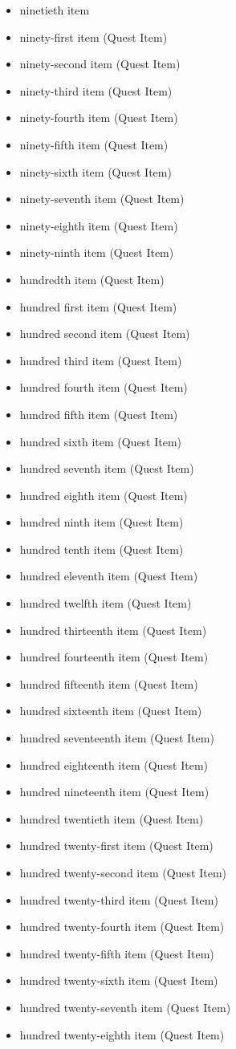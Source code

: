 \documentclass[11pt,letterpaper,oldstylefigures]{memoir}
\begin{document}
\begin{itemize}
\item ninetieth item
\item ninety-first item (Quest Item)
\item ninety-second item (Quest Item)
\item ninety-third item (Quest Item)
\item ninety-fourth item (Quest Item)
\item ninety-fifth item (Quest Item)
\item ninety-sixth item (Quest Item)
\item ninety-seventh item (Quest Item)
\item ninety-eighth item (Quest Item)
\item ninety-ninth item (Quest Item)
\item hundredth item (Quest Item)
\item hundred first item (Quest Item)
\item hundred second item (Quest Item)
\item hundred third item (Quest Item)
\item hundred fourth item (Quest Item)
\item hundred fifth item (Quest Item)
\item hundred sixth item (Quest Item)
\item hundred seventh item (Quest Item)
\item hundred eighth item (Quest Item)
\item hundred ninth item (Quest Item)
\item hundred tenth item (Quest Item)
\item hundred eleventh item (Quest Item)
\item hundred twelfth item (Quest Item)
\item hundred thirteenth item (Quest Item)
\item hundred fourteenth item (Quest Item)
\item hundred fifteenth item (Quest Item)
\item hundred sixteenth item (Quest Item)
\item hundred seventeenth item (Quest Item)
\item hundred eighteenth item (Quest Item)
\item hundred nineteenth item (Quest Item)
\item hundred twentieth item (Quest Item)
\item hundred twenty-first item (Quest Item)
\item hundred twenty-second item (Quest Item)
\item hundred twenty-third item (Quest Item)
\item hundred twenty-fourth item (Quest Item)
\item hundred twenty-fifth item (Quest Item)
\item hundred twenty-sixth item (Quest Item)
\item hundred twenty-seventh item (Quest Item)
\item hundred twenty-eighth item (Quest Item)
\end{itemize}
\end{document}
